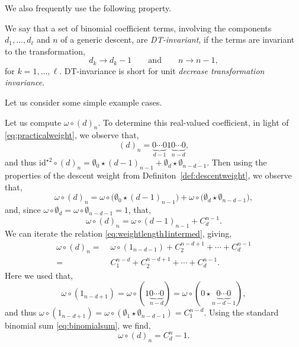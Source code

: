 \documentclass[5p,twocolumn]{elsarticle}
\newcommand*{\id}{{\mathrm{id}}}
\begin{document}
%
We also frequently use the following property.
%
\begin{definition}[DT-invariance]\label{def:DTinvariance}
  We say that a set of binomial coefficient terms, involving the components $d_1,\ldots,d_\ell$ and $n$ of a generic descent, are \emph{DT-invariant}, if the terms are invariant to the transformation, 
\begin{equation}\label{eq:DT}
  d_k\to d_k-1\qquad\text{and}\qquad n\to n-1,
\end{equation}
for $k=1,\ldots,\ell$. DT-invariance is short for unit \emph{decrease transformation invariance}. 
\end{definition}
%
Let us consider some simple example cases.
%
\begin{example}\label{ex:weightlength1}
Let us compute $\omega\circ(d)_n$. To determine this real-valued coefficient, in light of \eqref{eq:practicalweight}, we observe that,
\begin{equation*}
      (d)_n=\underbrace{0\cdots0}_{d-1}1\underbrace{0\cdots0}_{n-d}, 
\end{equation*}
and thus $ \id^{\star 2}\circ(d)_n=\emptyset_0\star(d-1)_{n-1}+\emptyset_d\star\emptyset_{n-d-1}$.
Then using the properties of the descent weight from Definiton~\ref{def:descentweight}, we observe that,  
\begin{equation*}
  \omega\circ(d)_n=\omega\circ\bigl(\emptyset_0\star(d-1)_{n-1}\bigr)+\omega\circ\bigl(\emptyset_d\star\emptyset_{n-d-1}\bigr),
\end{equation*}
and, since $\omega\circ\emptyset_d=\omega\circ\emptyset_{n-d-1}=1$, that,
\begin{equation}
  \omega\circ(d)_n=\omega\circ(d-1)_{n-1}+C_d^{n-1}. \label{eq:weightlength1intermed}
\end{equation}
We can iterate the relation \eqref{eq:weightlength1intermed}, giving,
\begin{align*}
  \omega\circ(d)_n=&\;\omega\circ(1_{n-d-1})+C_2^{n-d+1}+\cdots+C_d^{n-1}\\
  =&\;C_1^{n-d}+C_2^{n-d+1}+\cdots+C_d^{n-1}.
\end{align*}
Here we used that,
\begin{equation*}
  \omega\circ(1_{n-d+1})=\omega\circ(1\underbrace{0\cdots0}_{n-d})=\omega\circ (0\star\underbrace{0\cdots0}_{n-d-1}),
\end{equation*}
and thus $\omega\circ(1_{n-d+1})=\omega\circ(\emptyset_1\star\emptyset_{n-d-1})=C_1^{n-d}$. Using the standard binomial sum \eqref{eq:binomialsum}, we find,
\begin{equation}
  \omega\circ(d)_n=C_d^{n}-1. \label{eq:weightlength1}
\end{equation}
\end{example}
\end{document}
